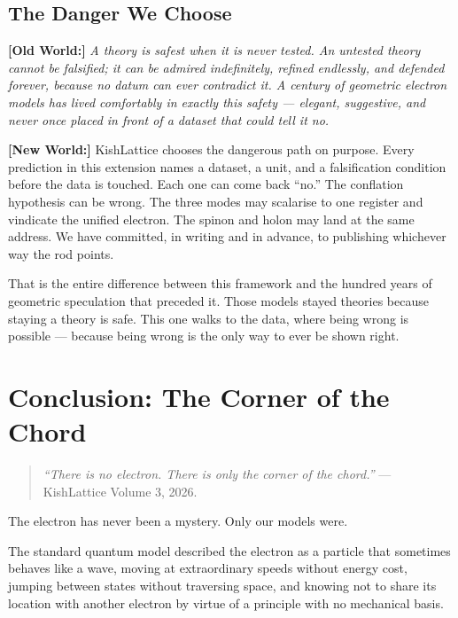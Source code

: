 \documentclass[11pt, letterpaper, openany]{book}
\newcommand{\oldworld}[1]{\noindent\textbf{\color{goldseal}[Old World:]}
  \textit{#1}\medskip}
\newcommand{\newworldcmd}[1]{\noindent\textbf{\color{kishblue}[New World:]}
  #1\medskip}
\begin{document}
\section{The Danger We Choose}
 
\oldworld{A theory is safest when it is never tested. An untested theory
cannot be falsified; it can be admired indefinitely, refined endlessly,
and defended forever, because no datum can ever contradict it. A century
of geometric electron models has lived comfortably in exactly this safety
--- elegant, suggestive, and never once placed in front of a dataset that
could tell it no.}
 
\newworldcmd{KishLattice chooses the dangerous path on purpose. Every
prediction in this extension names a dataset, a unit, and a falsification
condition before the data is touched. Each one can come back ``no.'' The
conflation hypothesis can be wrong. The three modes may scalarise to one
register and vindicate the unified electron. The spinon and holon may land
at the same address. We have committed, in writing and in advance, to
publishing whichever way the rod points.
 
That is the entire difference between this framework and the hundred years
of geometric speculation that preceded it. Those models stayed theories
because staying a theory is safe. This one walks to the data, where being
wrong is possible --- because being wrong is the only way to ever be shown
right.}

\chapter{Conclusion: The Corner of the Chord}

\begin{quote}
\textit{``There is no electron. There is only the corner of the chord.''}
--- KishLattice Volume 3, 2026.
\end{quote}

The electron has never been a mystery. Only our models were.

The standard quantum model described the electron as a particle
that sometimes behaves like a wave, moving at extraordinary speeds
without energy cost, jumping between states without traversing
space, and knowing not to share its location with another electron
by virtue of a principle with no mechanical basis.
\end{document}
